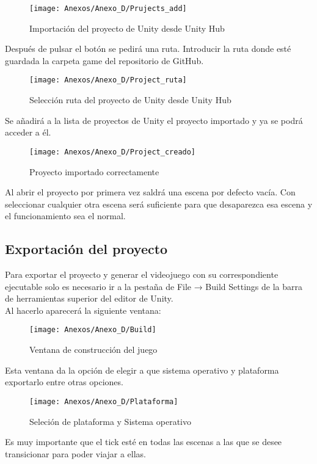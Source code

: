 \begin{figure}[h]
\centering
\texttt{[image: Anexos/Anexo\_D/Prujects\_add]}
\caption{Importación del proyecto de Unity desde Unity Hub}
\end{figure}
\clearpage

Después de pulsar el botón se pedirá una ruta. Introducir la ruta donde esté guardada la carpeta game del repositorio de GitHub.

\begin{figure}[h]
\centering
\texttt{[image: Anexos/Anexo\_D/Project\_ruta]}
\caption{Selección ruta del proyecto de Unity desde Unity Hub}
\end{figure}

Se añadirá a la lista de proyectos de Unity el proyecto importado y ya se podrá acceder a él.

\begin{figure}[h]
\centering
\texttt{[image: Anexos/Anexo\_D/Project\_creado]}
\caption{Proyecto importado correctamente}
\end{figure}

Al abrir el proyecto por primera vez saldrá una escena por defecto vacía. Con seleccionar cualquier otra escena será suficiente para que desaparezca esa escena y el funcionamiento sea el normal.

\subsection{Exportación del proyecto}
Para exportar el proyecto y generar el videojuego con su correspondiente ejecutable solo es necesario ir a la pestaña de File → Build Settings de la barra de herramientas superior del editor de Unity.\\
Al hacerlo aparecerá la siguiente ventana:

\begin{figure}[h]
\centering
\texttt{[image: Anexos/Anexo\_D/Build]}
\caption{Ventana de construcción del juego}
\end{figure}

Esta ventana da la opción de elegir a que sistema operativo y plataforma exportarlo entre otras opciones.

\begin{figure}[h]
\centering
\texttt{[image: Anexos/Anexo\_D/Plataforma]}
\caption{Seleción de plataforma y Sistema operativo}
\end{figure}

Es muy importante que el tick esté en todas las escenas a las que se desee transicionar para poder viajar a ellas.

